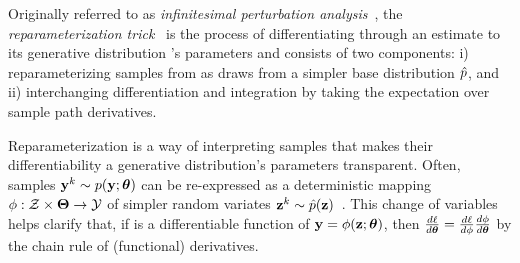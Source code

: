 Originally referred to as \emph{infinitesimal perturbation analysis}~\cite{cao1985convergence,glasserman1988performance}, the \emph{reparameterization trick}~\cite{kingma2013vae,JimenezRezende2014a} is the process of differentiating through an \MC estimate to its generative distribution \belief's parameters and consists of two components: 
% 
i) reparameterizing samples from \belief{} as draws from a simpler base distribution \(\hat{p}\), and 
% 
 ii) interchanging differentiation and integration by taking the expectation over sample path derivatives.
% 

Reparameterization is a way of interpreting samples that makes their differentiability \wrt{} a generative distribution's parameters transparent. Often, samples \(\mathbf{y}^{k} \sim p(\mathbf{y}; \boldsymbol{\theta})\) can be re-expressed as a deterministic mapping \(\phi : \mathcal{Z} \times \boldsymbol{\Theta} \to \mathcal{Y}\) of simpler random variates \(\mathbf{z}^{k} \sim \hat{p}(\mathbf{z})\)~\cite{kingma2013vae, JimenezRezende2014a}. This change of variables helps clarify that, if \acq{} is a differentiable function of \(\mathbf{y} = \phi(\mathbf{z};\boldsymbol{\theta})\), then \(\small{\frac{d\ensuremath{\ell}}{d\ensuremath{\boldsymbol{\theta}}}} = \small{\frac{d\ensuremath{\ell}}{d\ensuremath{\phi}}\frac{d\ensuremath{\phi}}{d\ensuremath{\boldsymbol{\theta}}}}\) by the chain rule of (functional) derivatives. 

